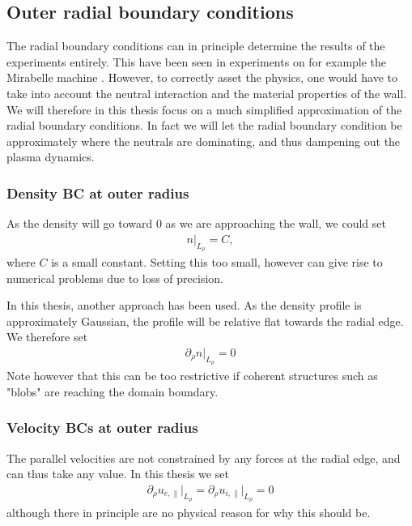 \subsection{Outer radial boundary conditions}
\label{sec:outerBC}
%
The radial boundary conditions can in principle determine the results of the experiments entirely.
This have been seen in experiments on for example the Mirabelle machine \cite{Schroder2001}.
However, to correctly asset the physics, one would have to take into account the neutral interaction and the material properties of the wall.
We will therefore in this thesis focus on a much simplified approximation of the radial boundary conditions.
In fact we will let the radial boundary condition be approximately where the neutrals are dominating, and thus dampening out the plasma dynamics.

\subsubsection{Density BC at outer radius}
As the density will go toward $0$ as we are approaching the wall, we could set
%
\begin{align*}
    n \bigg|_{L_\rho} = C,
\end{align*}
%
where $C$ is a small constant.
Setting this too small, however can give rise to numerical problems due to loss of precision.

In this thesis, another approach has been used.
As the density profile is approximately Gaussian, the profile will be relative flat towards the radial edge.
We therefore set
%
\begin{align*}
    \partial_\rho n \bigg|_{L_\rho} = 0
\end{align*}
%
Note however that this can be too restrictive if coherent structures such as "blobs"
are reaching the domain boundary.

\subsubsection{Velocity BCs at outer radius}
%
The parallel velocities are not constrained by any forces at the radial edge, and can thus take any value.
In this thesis we set
%
\begin{align*}
    \partial_\rho u_{e,\|} \bigg|_{L_\rho} = \partial_\rho u_{i,\|} \bigg|_{L_\rho} = 0
\end{align*}
%
although there in principle are no physical reason for why this should be.

